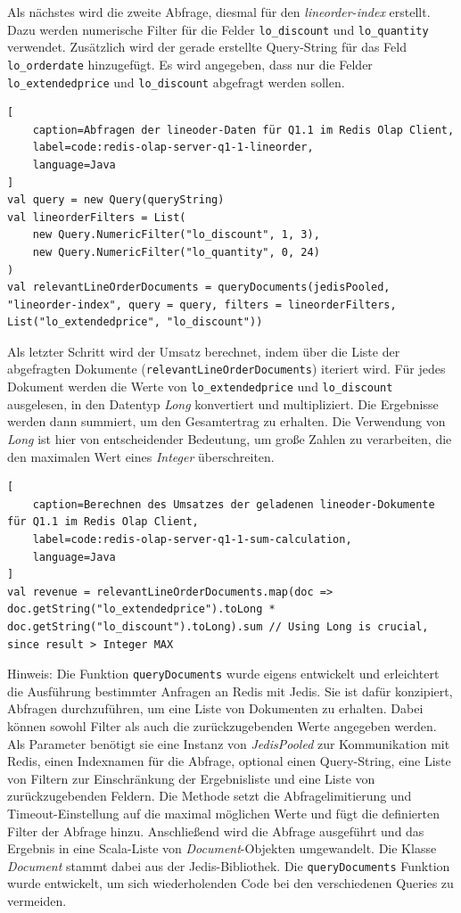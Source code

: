 Als nächstes wird die zweite Abfrage, diesmal für den \emph{lineorder-index} erstellt. Dazu werden numerische Filter für die Felder \lstinline|lo_discount| und \lstinline|lo_quantity| verwendet. Zusätzlich wird der gerade erstellte Query-String für das Feld \lstinline|lo_orderdate| hinzugefügt. Es wird angegeben, dass nur die Felder \lstinline|lo_extendedprice| und \lstinline|lo_discount| abgefragt werden sollen.

\begin{lstlisting}[
    caption=Abfragen der lineoder-Daten für Q1.1 im Redis Olap Client,
    label=code:redis-olap-server-q1-1-lineorder,
    language=Java
]
val query = new Query(queryString)
val lineorderFilters = List(
	new Query.NumericFilter("lo_discount", 1, 3),
	new Query.NumericFilter("lo_quantity", 0, 24)
)
val relevantLineOrderDocuments = queryDocuments(jedisPooled, "lineorder-index", query = query, filters = lineorderFilters, List("lo_extendedprice", "lo_discount"))
\end{lstlisting}


Als letzter Schritt wird der Umsatz berechnet, indem über die Liste der abgefragten Dokumente (\lstinline|relevantLineOrderDocuments|) iteriert wird. Für jedes Dokument werden die Werte von \lstinline|lo_extendedprice| und \lstinline|lo_discount| ausgelesen, in den Datentyp \emph{Long} konvertiert und multipliziert. Die Ergebnisse werden dann summiert, um den Gesamtertrag zu erhalten. Die Verwendung von \emph{Long} ist hier von entscheidender Bedeutung, um große Zahlen zu verarbeiten, die den maximalen Wert eines \emph{Integer} überschreiten.

\begin{lstlisting}[
    caption=Berechnen des Umsatzes der geladenen lineoder-Dokumente für Q1.1 im Redis Olap Client,
    label=code:redis-olap-server-q1-1-sum-calculation,
    language=Java
]
val revenue = relevantLineOrderDocuments.map(doc => doc.getString("lo_extendedprice").toLong * doc.getString("lo_discount").toLong).sum // Using Long is crucial, since result > Integer MAX
\end{lstlisting}

Hinweis: Die Funktion \lstinline|queryDocuments| wurde eigens entwickelt und erleichtert die Ausführung bestimmter Anfragen an Redis mit Jedis. Sie ist dafür konzipiert, Abfragen durchzuführen, um eine Liste von Dokumenten zu erhalten. Dabei können sowohl Filter als auch die zurückzugebenden Werte angegeben werden. Als Parameter benötigt sie eine Instanz von \emph{JedisPooled} zur Kommunikation mit Redis, einen Indexnamen für die Abfrage, optional einen Query-String, eine Liste von Filtern zur Einschränkung der Ergebnisliste und eine Liste von zurückzugebenden Feldern. Die Methode setzt die Abfragelimitierung und Timeout-Einstellung auf die maximal möglichen Werte und fügt die definierten Filter der Abfrage hinzu. Anschließend wird die Abfrage ausgeführt und das Ergebnis in eine Scala-Liste von \emph{Document}-Objekten umgewandelt. Die Klasse \emph{Document} stammt dabei aus der Jedis-Bibliothek.
Die \lstinline|queryDocuments| Funktion wurde entwickelt, um sich wiederholenden Code bei den verschiedenen Queries zu vermeiden.

